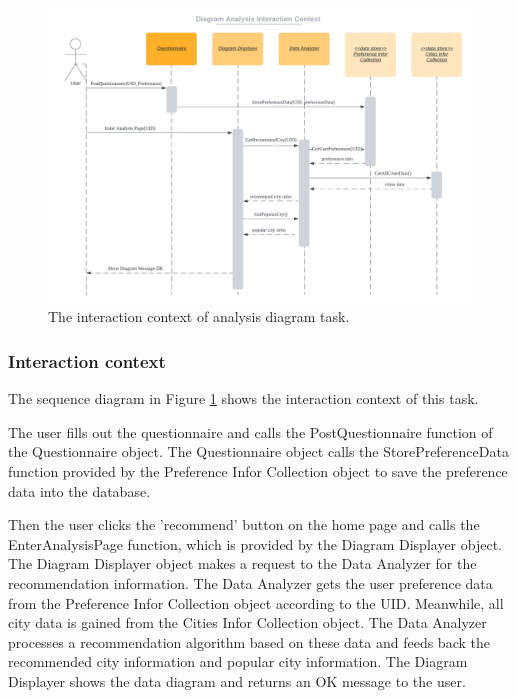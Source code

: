 \documentclass[conference]{IEEEtran}
\begin{document}
\begin{figure}[htbp]
\centerline{\includegraphics[width=1.0\textwidth]{diagram_interaction_context.pdf}}
\caption{The interaction context of analysis diagram task.}
\label{diagram_interaction}
\end{figure}

\subsubsection{\textbf{Interaction context }}

\textbf{}

The sequence diagram in Figure \ref{diagram_interaction} shows the interaction context of this task. 

The user fills out the questionnaire and calls the PostQuestionnaire function of the Questionnaire object. The Questionnaire object calls the StorePreferenceData function provided by the Preference Infor Collection object to save the preference data into the database. 

Then the user clicks the 'recommend' button on the home page and calls the EnterAnalysisPage function, which is provided by the Diagram Displayer object. The Diagram Displayer object makes a request to the Data Analyzer for the recommendation information. The Data Analyzer gets the user preference data from the Preference Infor Collection object according to the UID. Meanwhile, all city data is gained from the Cities Infor Collection object. The Data Analyzer processes a recommendation algorithm based on these data and feeds back the recommended city information and popular city information. The Diagram Displayer shows the data diagram and returns an OK message to the user.
\end{document}
